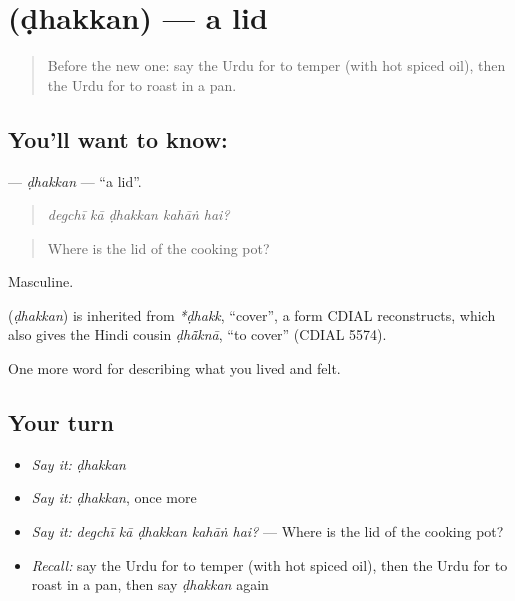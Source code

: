 \section[\texorpdfstring{\ur{ڈھکن} (ḍhakkan)}{ڈھکن (ḍhakkan)}]{ (ḍhakkan) — a lid}

\label{lesson:UR-C508-dhakkan}



\begin{quote}
Before the new one: say the Urdu for to temper (with hot spiced oil), then the Urdu for to roast in a pan.
\end{quote}

\subsection*{You'll want to know: }
\textbf{} — \emph{ḍhakkan} — \textquotedblleft{}a lid\textquotedblright{}.

\begin{quote}
    
\end{quote}

\begin{quote}
\emph{degchī kā ḍhakkan kahāṅ hai?}
\end{quote}

\begin{quote}
Where is the lid of the cooking pot?
\end{quote}

Masculine.

\begin{cousinweb}
\textbf{} (\emph{ḍhakkan}) is inherited from \emph{*ḍhakk}, \textquotedblleft{}cover\textquotedblright{}, a form CDIAL reconstructs, which also gives the Hindi cousin \emph{ḍhā̃knā}, \textquotedblleft{}to cover\textquotedblright{} (CDIAL 5574).
\end{cousinweb}

\begin{grammarlens}[title={What you've built}]
One more word for describing what you lived and felt.
\end{grammarlens}

\subsection*{Your turn}
\begin{itemize}
\raggedright
  \item \emph{Say it:} \emph{ḍhakkan}
  \item \emph{Say it:} \emph{ḍhakkan}, once more
  \item \emph{Say it:} \emph{degchī kā ḍhakkan kahāṅ hai?} — Where is the lid of the cooking pot?
  \item \emph{Recall:} say the Urdu for to temper (with hot spiced oil), then the Urdu for to roast in a pan, then say \emph{ḍhakkan} again
\end{itemize}

